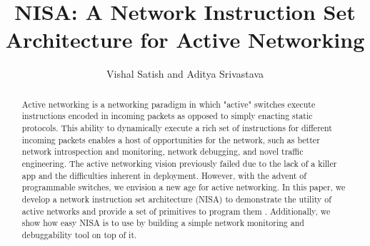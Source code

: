 \documentclass[sigconf]{acmart}
\begin{document}
\title{NISA: A Network Instruction Set Architecture for Active Networking}


\author{Vishal Satish and Aditya Srivastava}


\begin{abstract}
    Active networking is a networking paradigm in which "active" switches execute instructions encoded in incoming packets as opposed to simply enacting static protocols. This ability to dynamically execute a rich set of instructions for different incoming packets enables a host of opportunities for the network, such as better network introspection and monitoring, network debugging, and novel traffic engineering. The active networking vision previously failed due to the lack of a killer app and the difficulties inherent in deployment. However, with the advent of programmable switches, we envision a new age for active networking. In this paper, we develop a network instruction set architecture (NISA) to demonstrate the utility of active networks and provide a set of primitives to program them \cite{nisa}. Additionally, we show how easy NISA is to use by building a simple network monitoring and debuggability tool on top of it.
\end{abstract}

\maketitle





\end{document}
